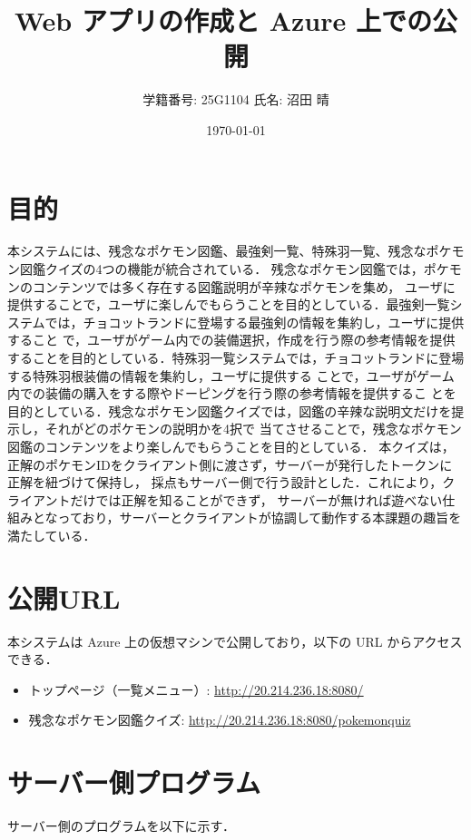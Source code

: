 \documentclass[a4paper,11pt]{ltjsarticle}
\title{Web アプリの作成と Azure 上での公開}
\author{学籍番号: 25G1104 \quad 氏名: 沼田 晴}
\date{\today}
\begin{document}
\maketitle

\section{目的}

本システムには、残念なポケモン図鑑、最強剣一覧、特殊羽一覧、残念なポケモン図鑑クイズの4つの機能が統合されている．
残念なポケモン図鑑では，ポケモンのコンテンツでは多く存在する図鑑説明が辛辣なポケモンを集め，
ユーザに提供することで，ユーザに楽しんでもらうことを目的としている．最強剣一覧システムでは，チョコットランドに登場する最強剣の情報を集約し，ユーザに提供すること
で，ユーザがゲーム内での装備選択，作成を行う際の参考情報を提供することを目的としている．特殊羽一覧システムでは，チョコットランドに登場する特殊羽根装備の情報を集約し，ユーザに提供する
ことで，ユーザがゲーム内での装備の購入をする際やドーピングを行う際の参考情報を提供するこ
とを目的としている．残念なポケモン図鑑クイズでは，図鑑の辛辣な説明文だけを提示し，それがどのポケモンの説明かを4択で
当てさせることで，残念なポケモン図鑑のコンテンツをより楽しんでもらうことを目的としている．
本クイズは，正解のポケモンIDをクライアント側に渡さず，サーバーが発行したトークンに正解を紐づけて保持し，
採点もサーバー側で行う設計とした．これにより，クライアントだけでは正解を知ることができず，
サーバーが無ければ遊べない仕組みとなっており，サーバーとクライアントが協調して動作する本課題の趣旨を満たしている．

\section{公開URL}

本システムは Azure 上の仮想マシンで公開しており，以下の URL からアクセスできる．

\begin{itemize}
  \item トップページ（一覧メニュー）: \url{http://20.214.236.18:8080/}
  \item 残念なポケモン図鑑クイズ: \url{http://20.214.236.18:8080/pokemonquiz}
\end{itemize}

\section{サーバー側プログラム}

サーバー側のプログラムを以下に示す．


\end{document}
